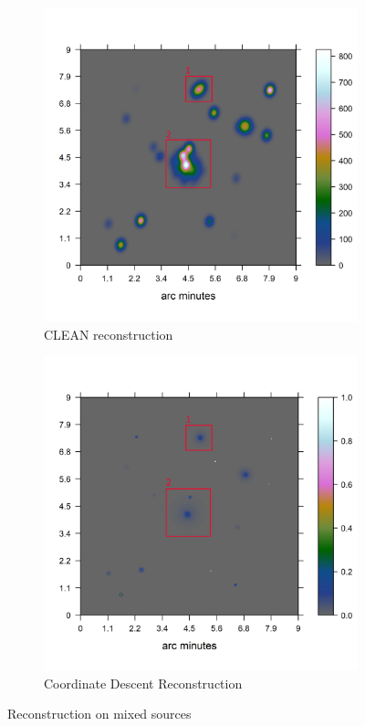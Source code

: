 \begin{figure}[h]
	\centering
	\begin{subfigure}[b]{0.4\linewidth}
		\includegraphics[width=\linewidth, trim={0.2in, 0.2in, 0, 0.2in}, clip]{./chapters/20.results/mixed/mixed_clean_boxed.png}
		\caption{CLEAN reconstruction}
		\label{results:mixed:tclean}
	\end{subfigure}
	\begin{subfigure}[b]{0.4\linewidth}
		\includegraphics[width=\linewidth, trim={0.2in, 0.2in, 0, 0.2in}, clip]{./chapters/20.results/mixed/mixed_cd_boxed.png}
		\caption{Coordinate Descent Reconstruction}
		\label{results:mixed:cd}
	\end{subfigure}
	\caption{Reconstruction on mixed sources}
	\label{results:mixed}
\end{figure}

